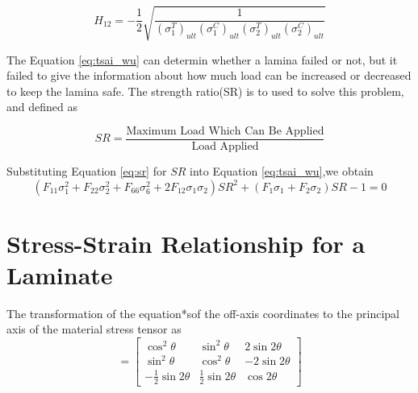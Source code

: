\documentclass[smallextended]{svjour3}       %
\begin{document}
\begin{equation}
	H_{12}=-\frac{1}{2} \sqrt{\frac{1}{\left(\sigma_{1}^{T}\right)_{u l
				t}\left(\sigma_{1}^{C}\right)_{u l t}\left(\sigma_{2}^{T}\right)_{u l
	t}\left(\sigma_{2}^{C}\right)_{u l t}}}
\end{equation}

The Equation \ref{eq:tsai_wu} can determin whether a lamina failed or not, but it failed to give the
information about how much load can be increased or decreased to keep the lamina safe. The strength
ratio(SR) is to used to solve this problem, and defined as

\begin{equation} \label{eq:sr}
	S R=\frac{\text {Maximum Load Which Can Be Applied}}{\text {Load Applied}}
\end{equation}


Substituting Equation \ref{eq:sr} for $SR$ into Equation \ref{eq:tsai_wu},we obtain
\begin{equation}
		(F_{11}\sigma_1^2+F_{22}\sigma_2^2+F_{66}\sigma_6^2+2F_{12}\sigma_1\sigma_2)SR^2 
						 +(F_1\sigma_1+F_2\sigma_2)SR-1=0
\end{equation}




\section{Stress-Strain Relationship for a Laminate}
The transformation of the equation*sof the off-axis coordinates to the principal axis of the material stress tensor as
\begin{equation}
    [T]=
    \begin{bmatrix}
        \cos^2\theta & \sin^2\theta & 2\sin2\theta \\
        \sin^2\theta & \cos^2\theta & -2\sin2\theta \\
        -\frac{1}{2}\sin2\theta & \frac{1}{2}\sin2\theta & \cos2\theta
    \end{bmatrix}
\end{equation}
\end{document}
